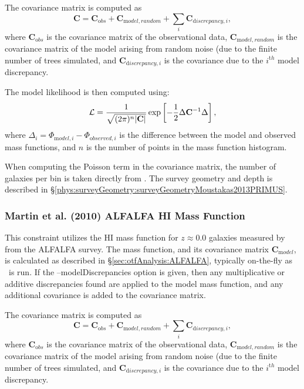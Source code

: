 The covariance matrix is computed as
\begin{equation}
 {\mathbf C} = {\mathbf C}_{\mathrm obs} + {\mathbf C}_{\mathrm model,random} + \sum_i {\mathbf C}_{{\mathrm discrepancy}, i},
\end{equation}
where ${\mathbf C}_{\mathrm obs}$ is the covariance matrix of the observational data, ${\mathbf C}_{\mathrm model,random}$ is the covariance matrix of the model arising from random noise (due to the finite number of trees simulated, and ${\mathbf C}_{{\mathrm discrepancy}, i}$ is the covariance due to the $i^{\mathrm th}$ model discrepancy.

The model likelihood is then computed using:
\begin{equation}
 \mathcal{L} = {1 \over \sqrt{(2 \pi)^n |{\mathbf C}|}} \exp\left[ -{1\over 2} \Delta {\mathbf C}^{-1} \Delta \right],
\end{equation}
where $\Delta_i = \Phi_{{\mathrm model}, i} - \Phi_{{\mathrm observed}, i}$ is the difference between the model and observed mass functions, and $n$ is the number of points in the mass function histogram.

When computing the Poisson term in the covariance matrix, the number of galaxies per bin is taken directly from \cite{moustakas_primus:_2013}. The survey geometry and depth is described in \S\ref{phys:surveyGeometry:surveyGeometryMoustakas2013PRIMUS}.

\subsubsection{Martin et al. (2010) ALFALFA HI Mass Function}\label{sec:AnalysisALFALFAHIMassFunction}

This constraint utilizes the HI mass function for $z\approx 0.0$ galaxies measured by \cite{martin_arecibo_2010} from the ALFALFA survey. The mass function, and its covariance matrix ${\mathbf C}_{\mathrm model}$, is calculated as described in \S\ref{sec:otfAnalysis:ALFALFA}, typically on-the-fly as \glc\ is run. If the {\normalfont \ttfamily --modelDiscrepancies} option is given, then any multiplicative or additive discrepancies found are applied to the model mass function, and any additional covariance is added to the covariance matrix.

The covariance matrix is computed as
\begin{equation}
 {\mathbf C} = {\mathbf C}_{\mathrm obs} + {\mathbf C}_{\mathrm model,random} + \sum_i {\mathbf C}_{{\mathrm discrepancy}, i},
\end{equation}
where ${\mathbf C}_{\mathrm obs}$ is the covariance matrix of the observational data, ${\mathbf C}_{\mathrm model,random}$ is the covariance matrix of the model arising from random noise (due to the finite number of trees simulated, and ${\mathbf C}_{{\mathrm discrepancy}, i}$ is the covariance due to the $i^{\mathrm th}$ model discrepancy.

